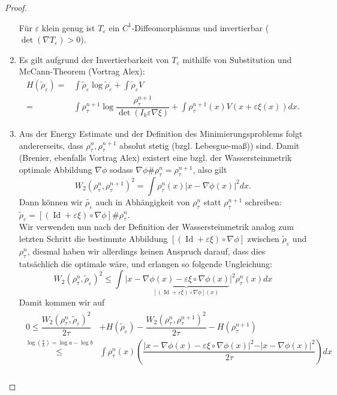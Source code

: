 \documentclass[11pt,a4paper,notitlepage]{scrreprt}
\begin{document}
\begin{proof}
\begin{enumerate}
Für $\varepsilon$ klein genug ist $T_\varepsilon$ ein $C^1$-Diffeomorphismus und invertierbar ($\det(\nabla T_\varepsilon)>0$).\\
\item Es gilt aufgrund der Invertierbarkeit von $T_\varepsilon$ mithilfe von Substitution und McCann-Theorem (Vortrag Alex):  
\begin{align}
H(\tilde{\rho}_\varepsilon)=&\int\tilde{\rho}_\varepsilon\log\tilde{\rho}_\varepsilon+\int\tilde{\rho}_\varepsilon V\\
=&\int \rho_\tau^{n+1}\log\dfrac{\rho_\tau^{n+1}}{\det(I_k\varepsilon \nabla \xi)}+\int \rho_\tau^{n+1}(x)V(x+\varepsilon\xi(x))dx.
\end{align}
\item Aus der Energy Estimate und der Definition des Minimierungsproblems folgt andererseits, dass $\rho_\tau^n, \rho_\tau^{n+1}$ absolut stetig (bzgl. Lebesgue-maß)) sind. Damit (Brenier, ebenfalls Vortrag Alex) existert eine bzgl. der Wassersteinmetrik optimale Abbildung $\nabla \phi$ sodass $\nabla \phi \# \rho_\tau^n=\rho_\tau^{n+1}$, also gilt
\begin{equation}
W_2(\rho_\tau^n,\rho_\tau^{n+1})^2=\int \rho_\tau^n(x)\vert x-\nabla\phi(x)\vert^2 dx.
\end{equation}
Dann können wir $\tilde{\rho_\varepsilon}$ auch in Abhängigkeit von $\rho_\tau^n$ statt $\rho_\tau^{n+1}$ schreiben: $\tilde{\rho}_\varepsilon=[(\operatorname{Id}+\varepsilon\xi)\circ\nabla\phi]\#\rho_\tau^n$.\\
Wir verwenden nun nach der Definition der Wassersteinmetrik analog zum letzten Schritt die bestimmte Abbildung $[(\operatorname{Id}+\varepsilon\xi)\circ\nabla\phi]$ zwischen $\tilde{\rho}_\varepsilon$ und $\rho_\tau^n$, diesmal haben wir allerdings keinen Anspruch darauf, dass dies tatsächlich die optimale wäre, und erlangen so folgende Ungleichung:
\begin{equation*}
W_2(\rho_\tau^n,\tilde{\rho}_\varepsilon)^2 \leq \int \vert x-\underset{[(\operatorname{Id}+\varepsilon\xi)\circ\nabla\phi](x)}{\underbrace{\nabla \phi(x)-\varepsilon\xi\circ\nabla\phi(x)}}\vert^2 \rho_\tau^n(x)dx
\end{equation*}
Damit kommen wir auf
\begin{align}
\begin{split}
0\leq\dfrac{W_2(\rho_\tau^n,\tilde{\rho}_\varepsilon)^2}{2\tau}&+H(\tilde{\rho}_\varepsilon)-\dfrac{W_2(\rho_\tau^n,\rho_\tau^{n+1})^2}{2\tau}-H(\rho_\tau^{n+1})\\
\overset{\log(\frac{a}{b})=\log a-\log b}\leq&\int\rho_\tau^n(x)\left(\dfrac{\vert x-\nabla \phi(x)-\varepsilon\xi\circ\nabla\phi(x)\vert^2-\vert x-\nabla\phi(x)\vert^2}{2\tau}\right)dx\\

\end{split}
\end{align}
\end{enumerate}
\end{proof}
\end{document}
